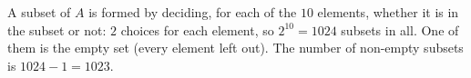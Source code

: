 A subset of $A$ is formed by deciding, for each of the $10$ elements, whether it is in the subset or not: $2$ choices for each element, so $2^{10}=1024$ subsets in all. One of them is the empty set (every element left out). The number of non-empty subsets is $1024-1=\boxed{1023}$.
